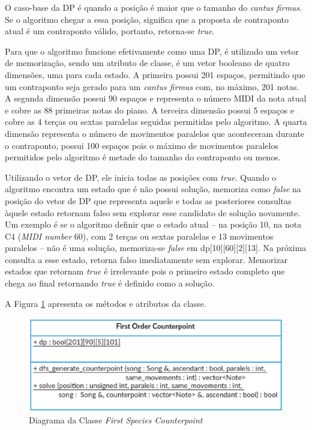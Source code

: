       O caso-base da DP é quando a posição é maior que o tamanho do \textit{cantus firmus}. Se o algoritmo chegar a essa posição, significa que a proposta de contraponto atual é um contraponto válido, portanto, retorna-se \textit{true}.

      Para que o algoritmo funcione efetivamente como uma DP, é utilizado um vetor de memorização, sendo um atributo de classe, é um vetor booleano de quatro dimensões, uma para cada estado. A primeira possui 201 espaços, permitindo que um contraponto seja gerado para um \textit{cantus firmus} com, no máximo, 201 notas. A segunda dimensão possui 90 espaços e representa o número MIDI da nota atual e cobre as 88 primeiras notas do piano. A terceira dimensão possui 5 espaços e cobre as 4 terças ou sextas paralelas seguidas permitidas pelo algoritmo. A quarta dimensão representa o número de movimentos paralelos que aconteceram durante o contraponto, possui 100 espaços pois o máximo de movimentos paralelos permitidos pelo algoritmo é metade do tamanho do contraponto ou menos.

      Utilizando o vetor de DP, ele inicia todas as posições com \textit{true}. Quando o algoritmo encontra um estado que é não possui solução, memoriza como \textit{false} na posição do vetor de DP que representa aquele e todas as posteriores consultas àquele estado retornam falso sem explorar esse candidato de solução novamente. Um exemplo é se o algoritmo definir que o estado atual -- na posição 10, na nota C4 (\textit{MIDI number} 60), com 2 terças ou sextas paralelas e 13 movimentos paralelos -- não é uma solução, memoriza-se \textit{false} em dp[10][60][2][13]. Na próxima consulta a esse estado, retorna falso imediatamente sem explorar. Memorizar estados que retornam \textit{true} é irrelevante pois o primeiro estado completo que chega ao final retornando \textit{true} é definido como a solução.

      A Figura \ref{firstordercounterpointclass} apresenta os métodos e atributos da classe.

      \begin{figure}[htb]
        \centering
        \includegraphics[scale=0.7]{figuras/firstordercounterpointclass.eps}
        \caption{Diagrama da Classe \textit{First Species Counterpoint}}
        \label{firstordercounterpointclass}
      \end{figure}

